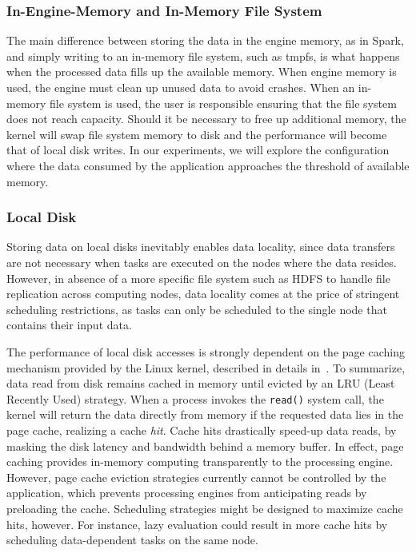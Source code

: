 \subsubsection{In-Engine-Memory and In-Memory File System} 

 The main difference between storing the data in the engine memory, as in Spark,
 and simply writing to an in-memory file system, such as tmpfs, is what happens
 when the processed data fills up the available memory. When engine memory is
 used, the engine must clean up unused data to avoid crashes. When an in-memory
 file system is used, the user is responsible ensuring that the file system does
 not reach capacity. Should it be necessary to free up additional memory, the
 kernel will swap file system memory to disk and the performance will become that
 of local disk writes. In our experiments, we will explore the configuration
 where the data consumed by the application approaches the threshold of
 available memory.

\subsubsection{Local Disk} %


Storing data on local disks inevitably enables data locality, since data
transfers are not necessary when tasks are executed on the nodes where the data
resides. However, in absence of a more specific file system such as HDFS to
handle file replication across computing nodes, data locality comes at the price
of stringent scheduling restrictions, as tasks can only be scheduled to the
single node that contains their input data.


The performance of local disk accesses is strongly dependent on the page caching
mechanism provided by the Linux kernel, described in    
details in~\cite{love2010linux}. To summarize, data read from disk remains
cached in memory until evicted by an LRU (Least Recently Used) strategy. When a
process invokes the \texttt{read()} system call, the kernel will return the data
directly from memory if the requested data lies in the page cache, realizing a
cache \emph{hit}. Cache hits drastically speed-up data reads, by masking the
disk latency and bandwidth behind a memory buffer. In effect, page caching
provides in-memory computing transparently to the processing engine. However,
page cache eviction strategies currently cannot be controlled by the
application, which prevents processing engines from anticipating reads by
preloading the cache. Scheduling strategies might be designed to maximize cache
hits, however. For instance, lazy evaluation could result in more cache hits by
scheduling data-dependent tasks on the same node.

